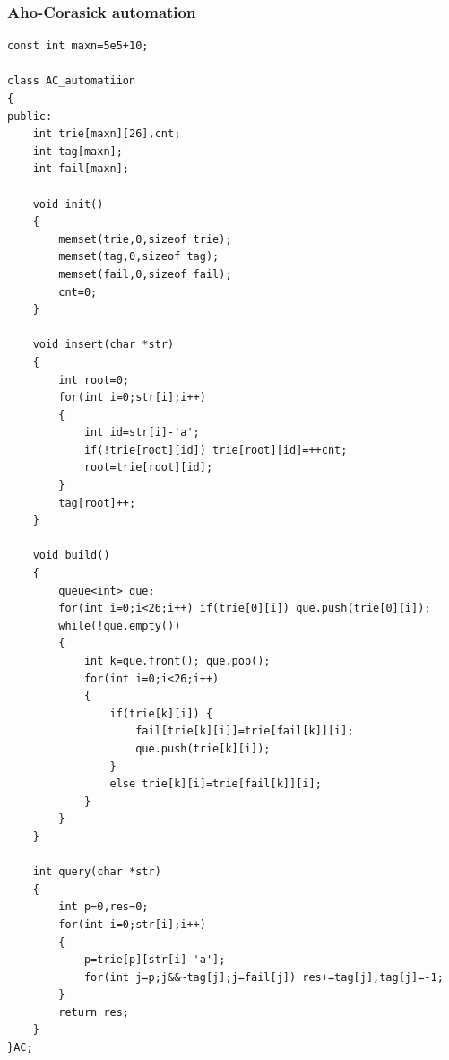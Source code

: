 \documentclass[twoside]{article}
\begin{document}
\subsubsection{Aho-Corasick automation}
\begin{lstlisting}
const int maxn=5e5+10;

class AC_automatiion
{
public:
	int trie[maxn][26],cnt;
	int tag[maxn];
	int fail[maxn];

	void init()
	{
	    memset(trie,0,sizeof trie);
	    memset(tag,0,sizeof tag);
	    memset(fail,0,sizeof fail);
	    cnt=0;
	}

	void insert(char *str)
	{
		int root=0;
		for(int i=0;str[i];i++)
		{
			int id=str[i]-'a';
			if(!trie[root][id]) trie[root][id]=++cnt;
			root=trie[root][id];
		}
		tag[root]++;
	}

	void build()
	{
		queue<int> que;
		for(int i=0;i<26;i++) if(trie[0][i]) que.push(trie[0][i]);
		while(!que.empty())
		{
			int k=que.front(); que.pop();
			for(int i=0;i<26;i++)
			{
				if(trie[k][i]) {
					fail[trie[k][i]]=trie[fail[k]][i];
					que.push(trie[k][i]);
				}
				else trie[k][i]=trie[fail[k]][i];
			}
		}
	}

	int query(char *str)
	{
		int p=0,res=0;
		for(int i=0;str[i];i++)
		{
			p=trie[p][str[i]-'a'];
			for(int j=p;j&&~tag[j];j=fail[j]) res+=tag[j],tag[j]=-1;
		}
		return res;
	}
}AC;\end{lstlisting}
\end{document}
